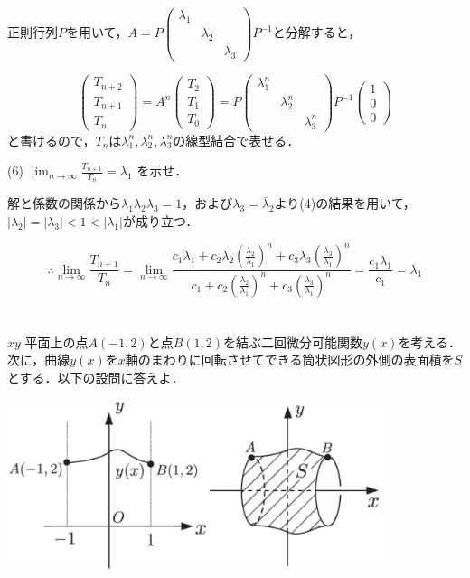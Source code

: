 \documentclass[a4j]{jarticle}
\let \ds \displaystyle
\begin{document}
正則行列$P$を用いて，$\ds A = P \begin{pmatrix} \lambda_1 & & \\ & \lambda_2 & \\ & & \lambda_3 \end{pmatrix} P^{-1}$と分解すると，

$$\begin{pmatrix} T_{n+2} \\ T_{n+1} \\ T_{n} \end{pmatrix} = A^n \begin{pmatrix} T_2 \\ T_1 \\ T_0 \end{pmatrix} = P \begin{pmatrix} \lambda_1^n & & \\ & \lambda_2^n & \\ & & \lambda_3^n \end{pmatrix}P^{-1}\begin{pmatrix} 1 \\ 0 \\ 0 \end{pmatrix}$$
と書けるので，$T_n$は$\lambda_1^n,\lambda_2^n,\lambda_3^n$の線型結合で表せる．

\begin{screen}
 (6) $\ds \lim_{n \rightarrow \infty} \frac{T_{n+1}}{T_n} = \lambda_1$ を示せ．
\end{screen}

解と係数の関係から$\lambda_1\lambda_2\lambda_3=1$，および$\lambda_3=\overline{\lambda}_2$より(4)の結果を用いて，$|\lambda_2|=|\lambda_3|<1<|\lambda_1|$が成り立つ．

$$\therefore \lim_{n \rightarrow \infty}\frac{T_{n+1}}{T_n}=\lim_{n \rightarrow \infty}\frac{c_1\lambda_1+c_2\lambda_2\left(\ds\frac{\lambda_2}{\lambda_1}\right)^n+c_3\lambda_3\left(\ds\frac{\lambda_3}{\lambda_1}\right)^n}{c_1+c_2\left(\ds\frac{\lambda_2}{\lambda_1}\right)^n+c_3\left(\ds\frac{\lambda_3}{\lambda_1}\right)^n}=\frac{c_1\lambda_1}{c_1}=\lambda_1$$

\section{}

\begin{screen}
 $xy$ 平面上の点$A(-1,2)$と点$B(1,2)$を結ぶ二回微分可能関数$y(x)$を考える．次に，曲線$y(x)$を$x$軸のまわりに回転させてできる筒状図形の外側の表面積を$S$とする．以下の設問に答えよ．
 
 \centering\includegraphics[width=11cm]{figure_2016_01.png}
\end{screen}
\end{document}
